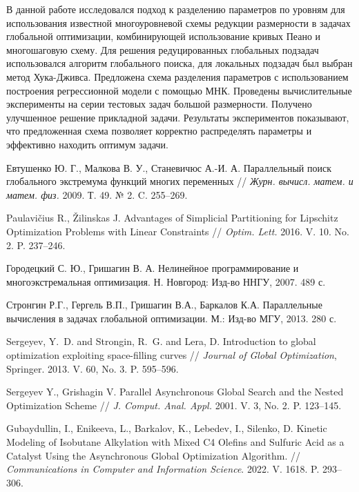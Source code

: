 \documentclass[11pt, oneside, a4paper]{article}
\begin{document}
В данной работе исследовался подход к разделению параметров по уровням для использования известной многоуровневой схемы редукции размерности в задачах глобальной оптимизации, комбинирующей использование кривых Пеано и многошаговую схему. Для решения редуцированных глобальных подзадач использовался алгоритм глобального поиска, для локальных подзадач был выбран метод Хука-Дживса. Предложена схема разделения параметров с использованием построения регрессионной модели с помощью МНК. Проведены вычислительные эксперименты на серии тестовых задач большой размерности. Получено улучшенное решение прикладной задачи. Результаты экспериментов показывают, что предложенная схема позволяет корректно распределять параметры и эффективно находить оптимум задачи.

\begin{biblio}

 Евтушенко Ю. Г., Малкова В. У., Станевичюс А.-И. А. Параллельный поиск глобального экстремума функций многих переменных // {\it Журн. вычисл. матем. и матем. физ.} 2009. Т. 49. № 2. C. 255--269.

 Paulavi{\v c}ius R., {\v Z}ilinskas J. Advantages of Simplicial Partitioning for Lipschitz Optimization Problems with Linear Constraints // {\it Optim. Lett.} 2016. V. 10. No. 2. P. 237--246.

 Городецкий С. Ю., Гришагин В. А. Нелинейное программирование и многоэкстремальная оптимизация. Н. Новгород: Изд-во ННГУ, 2007. 489 с.

 Стронгин Р.Г., Гергель В.П., Гришагин В.А., Баркалов К.А. Параллельные вычисления в задачах глобальной оптимизации. М.: Изд-во МГУ, 2013. 280 с.

 Sergeyev, Y.~D. and Strongin, R.~G. and Lera, D. Introduction to global optimization exploiting space-filling curves // {\it Journal of Global Optimization}, Springer. 2013. V. 60, No. 3. P. 595--596.

 Sergeyev Y., Grishagin V. Parallel Asynchronous Global Search and the Nested Optimization Scheme //  {\it J. Comput. Anal. Appl.} 2001. V. 3, No. 2. P. 123--145.

 Gubaydullin, I., Enikeeva, L., Barkalov, K., Lebedev, I., Silenko, D. Kinetic Modeling of Isobutane Alkylation with Mixed C4 Olefins and Sulfuric Acid as a Catalyst Using the Asynchronous Global Optimization Algorithm. // {\it Communications in Computer and Information Science}. 2022. V. 1618.  P. 293--306. 



\end{biblio}
\end{document}
